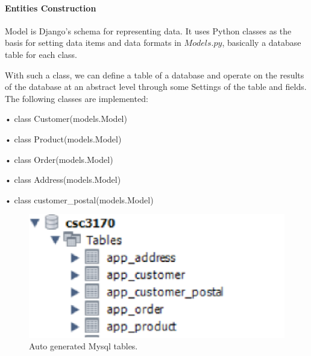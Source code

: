\paragraph{Entities Construction}
Model is Django's schema for representing data. It uses Python classes as the basis for setting data items and data formats in $Models.py$, basically a database table for each class. \par
With such a class, we can define a table of a database and operate on the results of the database at an abstract level through some Settings of the table and fields. The following classes are implemented: \par
• class Customer(models.Model) \par
• class Product(models.Model) \par
• class Order(models.Model)\par
• class Address(models.Model) \par
• class customer_postal(models.Model) \par
\begin{figure}[H]
    \centering
    \includegraphics[width=\columnwidth/2]{images/tables.png}
    \caption[Short text]{Auto generated Mysql tables.}
    \label{fig:ER}
\end{figure}
